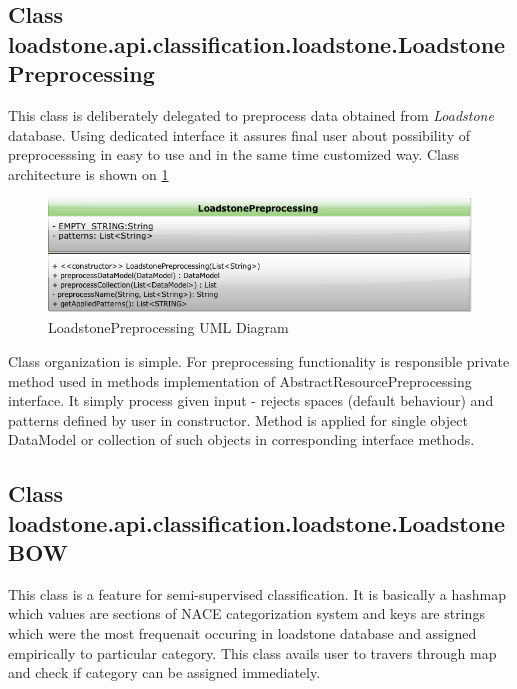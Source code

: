 \subsection{Class \newline loadstone.api.classification.loadstone.\newline LoadstonePreprocessing}
This class is deliberately delegated to preprocess data obtained from \textit{Loadstone} database. Using dedicated interface it assures final user about possibility of preprocesssing in easy to use and in the same time customized way. Class architecture is shown on \ref{fig:@=LoadstonePreprocessing}
\begin{figure}[h]
	\centering
	\includegraphics[scale=0.5]{LoadstonePreprocessing.png}
	\caption{LoadstonePreprocessing UML Diagram}
	\label{fig:@=LoadstonePreprocessing}
\end{figure}
Class organization is simple. For preprocessing functionality is responsible private method used in methods implementation of AbstractResourcePreprocessing interface. It simply process given input - rejects spaces (default behaviour) and patterns defined by user in constructor. Method is applied for single object DataModel or collection of such objects in corresponding interface methods.
\subsection{Class \newline loadstone.api.classification.loadstone.LoadstoneBOW}
\label{loadstone_bow}
This class is a feature for semi-supervised classification. It is basically a hashmap which values are sections of NACE categorization system and keys are strings which were the most frequenait occuring in loadstone database and assigned empirically to particular category. This class avails user to travers through map and check if category can be assigned immediately. 

